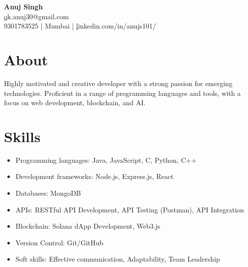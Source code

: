 \documentclass[10pt]{article}
\begin{document}
\begin{center}
    {\Huge \textbf{ Anuj Singh }}\\
    \vspace{0.05cm} %
    \href{mailto:ok.anuj30@gmail.com}ok.anuj30@gmail.com \\
    9301783525 | Mumbai | \href{https://linkedin.com/in/anujs101/}linkedin.com/in/anujs101/
\end{center}

\section*{About}
\vspace{0.05cm}
Highly motivated and creative developer with a strong passion for emerging technologies. Proficient in a range of programming languages and tools, with a focus on web development, blockchain, and AI.


\section*{Skills}
\vspace{0.05cm}
\begin{itemize}[leftmargin=0.5cm, itemsep=2pt] %

  \item Programming languages: Java, JavaScript, C, Python, C++

  \item Development frameworks: Node.js, Express.js, React

  \item Databases: MongoDB

  \item APIs: RESTful API Development, API Testing (Postman), API Integration

  \item Blockchain: Solana dApp Development, Web3.js

  \item Version Control: Git/GitHub

  \item Soft skills: Effective communication, Adaptability, Team Leadership

\end{itemize}
\end{document}
